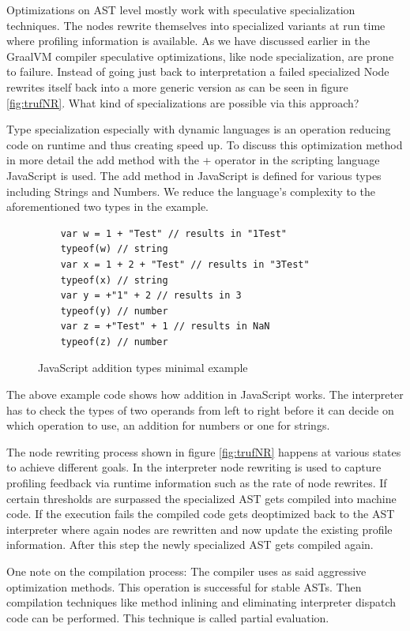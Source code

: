 Optimizations on AST level mostly work with speculative specialization techniques. The nodes rewrite themselves into specialized variants at run time where profiling information is available. \cite{wuerthSelf} As we have discussed earlier in the GraalVM compiler speculative optimizations, like node specialization, are prone to failure. Instead of going just back to interpretation a failed specialized Node rewrites itself back into a more generic version as can be seen in figure \ref{fig:trufNR}.  \cite{VMRule} What kind of specializations are possible via this approach?

Type specialization especially with dynamic languages is an operation reducing code on runtime and thus creating speed up. To discuss this optimization method in more detail the add method with the + operator in the scripting language JavaScript is used. The add method in JavaScript is defined for various types including Strings and Numbers. We reduce the language's complexity to the aforementioned two types in the example.
\begin{figure}[h!]
\begin{lstlisting}
	var w = 1 + "Test" // results in "1Test"
	typeof(w) // string
	var x = 1 + 2 + "Test" // results in "3Test"
	typeof(x) // string
	var y = +"1" + 2 // results in 3
	typeof(y) // number
	var z = +"Test" + 1 // results in NaN
	typeof(z) // number
\end{lstlisting}
\caption{JavaScript addition types minimal example}
\label{fig:jsTypes}
\end{figure}
The above example code shows how addition in JavaScript works. The interpreter has to check the types of two operands from left to right before it can decide on which operation to use, an addition for numbers or one for strings.

The node rewriting process shown in figure \ref{fig:trufNR} happens at various states to achieve different goals. In the interpreter node rewriting is used to capture profiling feedback via runtime information such as the rate of node rewrites. If certain thresholds are surpassed the specialized AST gets compiled into machine code. If the execution fails the compiled code gets deoptimized back to the AST interpreter where again nodes are rewritten and now update the existing profile information. After this step the newly specialized AST gets compiled again. \cite{wuerthSelf}

One note on the compilation process: The compiler uses as said aggressive optimization methods. This operation is successful for stable ASTs. Then compilation techniques like method inlining and eliminating interpreter dispatch code can be performed. This technique is called partial evaluation.

